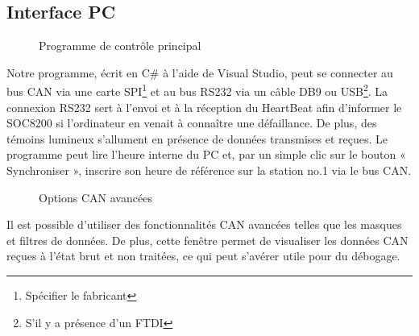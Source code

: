 \documentclass[10pt,a4paper,final]{article}
\begin{document}
\begin{spacing}{1.5}


\section{Interface PC}

\begin{figure}[hbtp]
\caption{Programme de contrôle principal}
\centering
{}
\end{figure}

Notre programme, écrit en C\# à l'aide de Visual Studio, peut se connecter au bus CAN via une carte SPI\footnote{Spécifier le fabricant} et au bus RS232 via un câble DB9 ou USB\footnote{S'il y a présence d'un FTDI}. La connexion RS232 sert à l'envoi et à la réception du HeartBeat afin d'informer le SOC8200 si l'ordinateur en venait à connaître une défaillance. De plus, des témoins lumineux s'allument en présence de données transmises et reçues. Le programme peut lire l'heure interne du PC et, par un simple clic sur le bouton « Synchroniser », inscrire son heure de référence sur la station no.1 via le bus CAN.\\
\vfill
\pagebreak


\begin{figure}[hbtp]
\caption{Options CAN avancées}
\centering
{}
\end{figure}
Il est possible d'utiliser des fonctionnalités CAN avancées telles que les masques et filtres de données. De plus, cette fenêtre permet de visualiser les données CAN reçues à l'état brut et non traitées, ce qui peut s'avérer utile pour du débogage.\pagebreak


\end{spacing}
\end{document}
